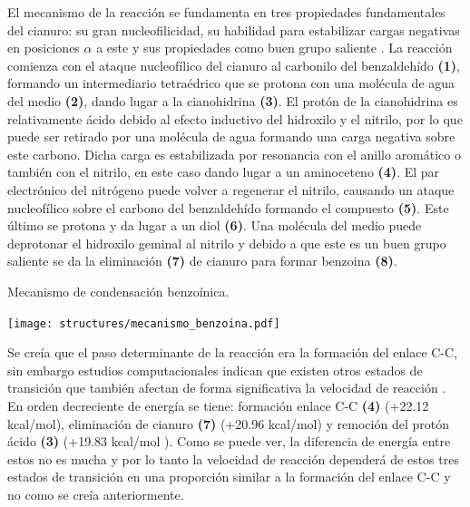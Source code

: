 \documentclass[fleqn,10pt]{SelfArx}
\begin{document}
El mecanismo de la reacción se fundamenta en tres propiedades fundamentales del cianuro: su gran nucleofilicidad, su habilidad para estabilizar cargas negativas en posiciones $\alpha$ a este y sus propiedades como buen grupo saliente \cite{cyanideioncatalyzedbenzoincondensation2014}. La reacción comienza con el ataque nucleofílico del cianuro al carbonilo del benzaldehído \textbf{(1)}, formando un intermediario tetraédrico que se protona con una molécula de agua del medio \textbf{(2)}, dando lugar a la cianohidrina \textbf{(3)}. El protón de la cianohidrina es relativamente ácido debido al efecto inductivo del hidroxilo y el nitrilo, por lo que puede ser retirado por una molécula de agua formando una carga negativa sobre este carbono. Dicha carga es estabilizada por resonancia con el anillo aromático o también con el nitrilo, en este caso dando lugar a un aminoceteno \textbf{(4)}. El par electrónico del nitrógeno puede volver a regenerar el nitrilo, causando un ataque nucleofílico sobre el carbono del benzaldehído formando el compuesto \textbf{(5)}. Este último se protona y da lugar a un diol \textbf{(6)}. Una molécula del medio puede deprotonar el hidroxilo geminal al nitrilo y debido a que este es un buen grupo saliente se da la eliminación \textbf{(7)} de cianuro para formar benzoina \textbf{(8)}.
\begin{scheme}[h]
	\centering
	\caption{Mecanismo de condensaci\'on benzo\'inica.}
	\texttt{[image: structures/mecanismo\_benzoina.pdf]}
\end{scheme}

Se creía que el paso determinante de la reacción era la formación del enlace C-C, sin embargo estudios computacionales indican que existen otros estados de transición que también afectan de forma significativa la velocidad de reacción \cite{yamabe2009}. En orden decreciente de energía se tiene: formación enlace C-C \textbf{(4)} (+22.12 kcal/mol), eliminación de cianuro \textbf{(7)} (+20.96 kcal/mol) y remoción del protón ácido \textbf{(3)} (+19.83 kcal/mol \cite{yamabe2009}). Como se puede ver, la diferencia de energía entre estos no es mucha y por lo tanto la velocidad de reacción dependerá de estos tres estados de transición en una proporción similar a la formación del enlace C-C y no como se creía anteriormente.
\end{document}
